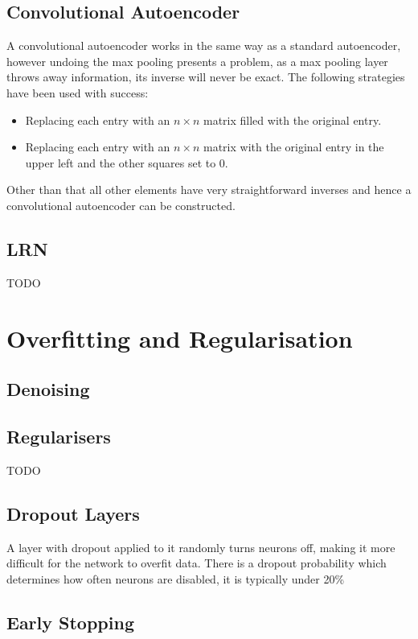     \subsection{Convolutional Autoencoder}
      A convolutional autoencoder works in the same way as a standard autoencoder, however
      undoing the max pooling presents a problem, as a max pooling layer throws away
      information, its inverse will never be exact. The following strategies have been
      used with success:
      \begin{itemize}
        \item Replacing each entry with an $n \times n$ matrix filled with the original
        entry.
        \item Replacing each entry with an  $n\times n$  matrix with
        the original entry in the upper left and the other squares set to 0. \cite{Dosovitskiy2015}
      \end{itemize}

      Other than that all other elements have very straightforward inverses and hence
      a convolutional autoencoder can be constructed.
    \subsection{LRN} \label{sec:lrn}
      TODO\cite{Krizhevsky2012}
  \section{Overfitting and Regularisation}
    \subsection{Denoising}
    \subsection{Regularisers}
      TODO
    \subsection{Dropout Layers} \label{sec:dropout}
      A layer with dropout applied to it randomly turns neurons off, making it more
      difficult for the network to overfit data. There is a dropout probability
      which determines how often neurons are disabled, it is typically under 20\%
    \subsection{Early Stopping}
